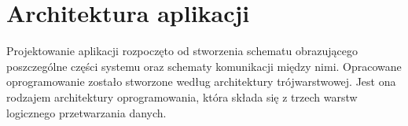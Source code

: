 \documentclass[12pt, twoside]{report}
\begin{document}

\section{Architektura aplikacji}
Projektowanie aplikacji rozpoczęto od stworzenia schematu obrazującego poszczególne części systemu oraz schematy komunikacji między nimi. Opracowane oprogramowanie zostało stworzone według architektury trójwarstwowej. Jest ona rodzajem architektury oprogramowania, która składa się z trzech warstw logicznego przetwarzania danych. 

\end{document}
